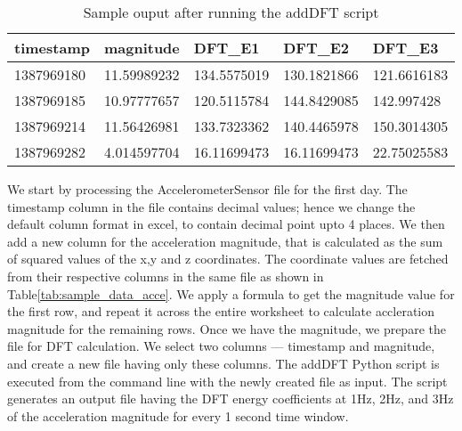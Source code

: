 \begin{table}[h]
	\centering	
	\caption{Sample ouput after running the addDFT script\label{tab:sample_acce_dft}}
  	\begin{tabular}{ | p{1.1cm} | p{1.3cm} | p{1.4cm} | p{1.4cm} | p{1.4cm} | }
    	\hline
	    \textbf{timestamp} & \textbf{magnitude} & \textbf{DFT\_E1} & \textbf{DFT\_E2} & \textbf{DFT\_E3} \\ \hline
		1387969180 & 11.59989232 & 134.5575019 & 130.1821866 & 121.6616183 \\ \hline
		1387969185 & 10.97777657 & 120.5115784 & 144.8429085 & 142.997428 \\ \hline
		1387969214 & 11.56426981 & 133.7323362 & 140.4465978 & 150.3014305 \\ \hline
		1387969282 & 4.014597704 & 16.11699473 & 16.11699473 & 22.75025583 \\
	    \hline
  	\end{tabular}
\end{table}

We start by processing the AccelerometerSensor file for the first day. The timestamp column in the file contains decimal values; hence we change the default column format in excel, to contain decimal point upto 4 places. We then add a new column for the acceleration magnitude, that is calculated as the sum of squared values of the x,y and z coordinates. The coordinate values are fetched from their respective columns in the same file as shown in Table\ref{tab:sample_data_acce}. We apply a formula to get the magnitude value for the first row, and repeat it across the entire worksheet to calculate accleration magnitude for the remaining rows. Once we have the magnitude, we prepare the file for DFT calculation. We select two columns --- timestamp and magnitude, and create a new file having only these columns. The addDFT Python script is executed from the command line with the newly created file as input. The script generates an output file having the DFT energy coefficients at 1Hz, 2Hz, and 3Hz of the acceleration magnitude for every 1 second time window.


